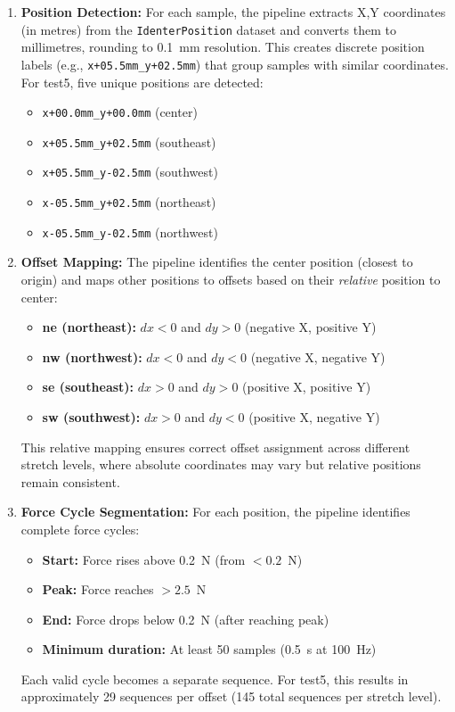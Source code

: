 \documentclass[11pt,a4paper]{article}
\begin{document}
\begin{enumerate}[leftmargin=1.5em]
    \item \textbf{Position Detection:} For each sample, the pipeline extracts X,Y coordinates (in metres) from the \texttt{IdenterPosition} dataset and converts them to millimetres, rounding to 0.1~mm resolution. This creates discrete position labels (e.g., \texttt{x+05.5mm\_y+02.5mm}) that group samples with similar coordinates. For test5, five unique positions are detected:
    \begin{itemize}[leftmargin=1.5em]
        \item \texttt{x+00.0mm\_y+00.0mm} (center)
        \item \texttt{x+05.5mm\_y+02.5mm} (southeast)
        \item \texttt{x+05.5mm\_y-02.5mm} (southwest)
        \item \texttt{x-05.5mm\_y+02.5mm} (northeast)
        \item \texttt{x-05.5mm\_y-02.5mm} (northwest)
    \end{itemize}
    
    \item \textbf{Offset Mapping:} The pipeline identifies the center position (closest to origin) and maps other positions to offsets based on their \emph{relative} position to center:
    \begin{itemize}[leftmargin=1.5em]
        \item \textbf{ne (northeast):} $dx < 0$ and $dy > 0$ (negative X, positive Y)
        \item \textbf{nw (northwest):} $dx < 0$ and $dy < 0$ (negative X, negative Y)
        \item \textbf{se (southeast):} $dx > 0$ and $dy > 0$ (positive X, positive Y)
        \item \textbf{sw (southwest):} $dx > 0$ and $dy < 0$ (positive X, negative Y)
    \end{itemize}
    This relative mapping ensures correct offset assignment across different stretch levels, where absolute coordinates may vary but relative positions remain consistent.
    
    \item \textbf{Force Cycle Segmentation:} For each position, the pipeline identifies complete force cycles:
    \begin{itemize}[leftmargin=1.5em]
        \item \textbf{Start:} Force rises above 0.2~N (from $< 0.2$~N)
        \item \textbf{Peak:} Force reaches $> 2.5$~N
        \item \textbf{End:} Force drops below 0.2~N (after reaching peak)
        \item \textbf{Minimum duration:} At least 50 samples (0.5~s at 100~Hz)
    \end{itemize}
    Each valid cycle becomes a separate sequence. For test5, this results in approximately 29 sequences per offset (145 total sequences per stretch level).
\end{enumerate}
\end{document}
